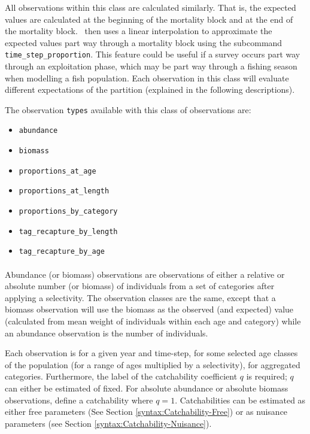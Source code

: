 All observations within this class are calculated similarly. That is, the expected values are calculated at the beginning of the mortality block and at the end of the mortality block. \CNAME\ then uses a linear interpolation to approximate the expected values part way through a mortality block using the subcommand \texttt{time\_step\_proportion}. This feature could be useful if a survey occurs part way through an exploitation phase, which may be part way through a fishing season when modelling a fish population. Each observation in this class will evaluate different expectations of the partition (explained in the following descriptions).

The observation \texttt{types} available with this class of observations are:

\begin{itemize}
	\item \texttt{abundance}
	\item \texttt{biomass}
	\item \texttt{proportions\_at\_age}
	\item \texttt{proportions\_at\_length}
	\item \texttt{proportions\_by\_category}
	\item \texttt{tag\_recapture\_by\_length}
	\item \texttt{tag\_recapture\_by\_age}
\end{itemize}

\paragraph*{}\label{sec:Observation-Abundance}\label{sec:Observation-Biomass}

Abundance (or biomass) observations are observations of either a relative or absolute number (or biomass) of individuals from a set of categories after applying a selectivity. The observation classes are the same, except that a biomass observation will use the biomass as the observed (and expected) value (calculated from mean weight of individuals within each age and category) while an abundance observation is the number of individuals.

Each observation is for a given year and time-step, for some selected age classes of the population (for a range of ages multiplied by a selectivity), for aggregated categories. Furthermore, the label of the catchability coefficient $q$ is required;  $q$ can either be estimated of fixed. For absolute abundance or absolute biomass observations, define a catchability where $q=1$. Catchabilities can be estimated as either free parameters (See Section \ref{syntax:Catchability-Free}) or as nuisance parameters (see Section \ref{syntax:Catchability-Nuisance}). 

